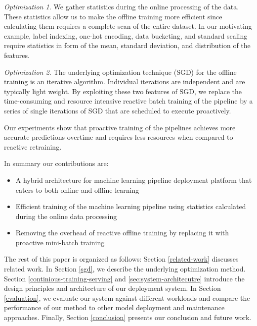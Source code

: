 \textit{Optimization 1.} 
We gather statistics during the online processing of the data. 
These statistics allow us to make the offline training more efficient since calculating them requires a complete scan of the entire dataset.
In our motivating example, label indexing, one-hot encoding, data bucketing, and standard scaling require statistics in form of the mean, standard deviation, and distribution of the features.

\textit{Optimization 2.}
The underlying optimization technique (SGD) for the offline training is an iterative algorithm.
Individual iterations are independent and are typically light weight.
By exploiting these two features of SGD, we replace the time-consuming and resource intensive reactive batch training of the pipeline by a series of single iterations of SGD that are scheduled to execute proactively.

Our experiments show that proactive training of the pipelines achieves more accurate predictions overtime and requires less resources when compared to reactive retraining.

In summary our contributions are:
\begin{itemize}
\item A hybrid architecture for machine learning pipeline deployment platform that caters to both online and offline learning
\item Efficient training of the machine learning pipeline using statistics calculated during the online data processing
\item Removing the overhead of reactive offline training by replacing it with proactive mini-batch training
\end{itemize}

The rest of this paper is organized as follows:
Section \ref {related-work} discusses related work.
In Section \ref{sgd}, we describe the underlying optimization method.
Section \ref{continious-training-serving} and \ref{sec:system-architecutre} introduce the design principles and architecture of our deployment system.
In Section \ref{evaluation}, we evaluate our system against different workloads and compare the performance of our method to other model deployment and maintenance approaches. 
Finally, Section \ref{conclusion} presents our conclusion and future work.
%


